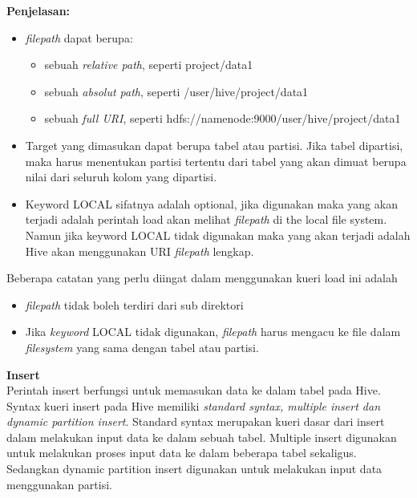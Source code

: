 \textbf{Penjelasan: }
\begin{itemize}
	\item \textit{filepath} dapat berupa:
		\begin{itemize}
			\item sebuah \textit{relative path}, seperti project/data1
			\item sebuah \textit{absolut path}, seperti /user/hive/project/data1
			\item sebuah \textit{full URI}, seperti hdfs://namenode:9000/user/hive/project/data1
		\end{itemize}
	\item Target yang dimasukan dapat berupa tabel atau partisi. Jika tabel dipartisi, maka harus menentukan partisi tertentu dari tabel yang akan dimuat berupa nilai dari seluruh kolom yang dipartisi.
	\item Keyword LOCAL sifatnya adalah optional, jika digunakan maka yang akan terjadi adalah perintah load akan melihat \textit{filepath} di the local file system. Namun jika keyword LOCAL tidak digunakan maka yang akan terjadi adalah Hive akan menggunakan URI \textit{filepath} lengkap.
\end{itemize}

Beberapa catatan yang perlu diingat dalam menggunakan kueri load ini adalah
\begin{itemize}
	\item \textit{filepath} tidak boleh terdiri dari sub direktori
	\item Jika \textit{keyword} LOCAL tidak digunakan, \textit{filepath} harus mengacu ke file dalam \textit{filesystem} yang sama dengan tabel atau partisi.
\end{itemize}

\textbf{Insert}\\
Perintah insert berfungsi untuk memasukan data ke dalam tabel pada Hive. Syntax kueri insert pada Hive memiliki \textit{standard syntax, multiple insert dan dynamic partition insert}. Standard syntax merupakan kueri dasar dari insert dalam melakukan input data ke dalam sebuah tabel. Multiple insert digunakan untuk melakukan proses input data ke dalam beberapa tabel sekaligus. Sedangkan dynamic partition insert digunakan untuk melakukan input data menggunakan partisi.

